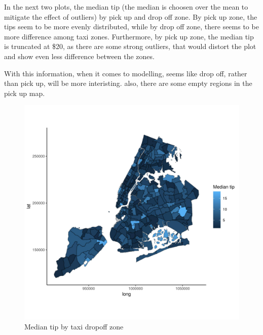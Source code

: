 \documentclass[11pt]{article}
\begin{document}
In the next two plots, the median tip (the median is choosen over the mean
to mitigate the effect of outliers) by pick up and drop off zone. By pick up
zone, the tips seem to be more evenly distributed, while by drop off zone,
there seems to be more difference among taxi zones. Furthermore, by pick up
zone, the median tip is truncated at \$20, as there are some strong outliers,
that would distort the plot and show even less difference between the zones.

With this information, when it comes to modelling, seems like drop off, rather
than pick up, will be more interisting. also, there are some empty regions in the
pick up map.

\begin{figure}[htbp]
\centering
\includegraphics[width=.9\linewidth]{./plots/destinationTipMap.jpg}
\caption{\label{fig:org38fb0c4}
Median tip by taxi dropoff zone}
\end{figure}
\end{document}
